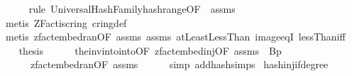 \begin{isabellebody}
\ \ \ \ \isamarkupfalse%
\ {\isacharparenleft}{\kern0pt}rule\ UniversalHashFamily{\isachardot}{\kern0pt}hash{\isacharunderscore}{\kern0pt}range{\isacharbrackleft}{\kern0pt}OF\ {\isacharunderscore}{\kern0pt}\ assms{\isacharparenleft}{\kern0pt}{}{\isacharparenright}{\kern0pt}{\isacharbrackright}{\kern0pt}{\isacharparenright}{\kern0pt}\isanewline
\ \ \ \ \ \isamarkupfalse%
\ {\isacharparenleft}{\kern0pt}metis\ ZFact{\isacharunderscore}{\kern0pt}is{\isacharunderscore}{\kern0pt}cring\ cring{\isacharunderscore}{\kern0pt}def{\isacharparenright}{\kern0pt}\isanewline
\ \ \ \ \isamarkupfalse%
\ {\isacharparenleft}{\kern0pt}metis\ zfact{\isacharunderscore}{\kern0pt}embed{\isacharunderscore}{\kern0pt}ran{\isacharbrackleft}{\kern0pt}OF\ assms{\isacharparenleft}{\kern0pt}{}{\isacharparenright}{\kern0pt}{\isacharbrackright}{\kern0pt}\ assms{\isacharparenleft}{\kern0pt}{}{\isacharparenright}{\kern0pt}\ atLeast{}LessThan\ image{\isacharunderscore}{\kern0pt}eqI\ lessThan{\isacharunderscore}{\kern0pt}iff{\isacharparenright}{\kern0pt}\isanewline
\ \ \isamarkupfalse%
\ {\isacharquery}{\kern0pt}thesis\isanewline
\ \ \ \ \isamarkupfalse%
\ the{\isacharunderscore}{\kern0pt}inv{\isacharunderscore}{\kern0pt}into{\isacharunderscore}{\kern0pt}into{\isacharbrackleft}{\kern0pt}OF\ zfact{\isacharunderscore}{\kern0pt}embed{\isacharunderscore}{\kern0pt}inj{\isacharbrackleft}{\kern0pt}OF\ assms{\isacharparenleft}{\kern0pt}{}{\isacharparenright}{\kern0pt}{\isacharbrackright}{\kern0pt}{\isacharcomma}{\kern0pt}\ \ B{\isacharequal}{\kern0pt}{\isachardoublequoteopen}{\isacharbraceleft}{\kern0pt}{}{\isachardot}{\kern0pt}{\isachardot}{\kern0pt}{\isacharless}{\kern0pt}p{\isacharbraceright}{\kern0pt}{\isachardoublequoteclose}{\isacharbrackright}{\kern0pt}\isanewline
\ \ \ \ \ \ zfact{\isacharunderscore}{\kern0pt}embed{\isacharunderscore}{\kern0pt}ran{\isacharbrackleft}{\kern0pt}OF\ assms{\isacharparenleft}{\kern0pt}{}{\isacharparenright}{\kern0pt}{\isacharbrackright}{\kern0pt}\isanewline
\ \ \ \ \isamarkupfalse%
\ {\isacharparenleft}{\kern0pt}simp\ add{\isacharcolon}{\kern0pt}hash{\isachardot}{\kern0pt}simps{\isacharparenright}{\kern0pt}\isanewline
{}\isamarkupfalse%
%
\endisatagproof
{\isafoldproof}%
%
\isadelimproof
\isanewline
%
\endisadelimproof
\isanewline
{}\isamarkupfalse%
\ hash{\isacharunderscore}{\kern0pt}inj{\isacharunderscore}{\kern0pt}if{\isacharunderscore}{\kern0pt}degree{\isacharunderscore}{\kern0pt}{}{\isacharcolon}{\kern0pt}\isanewline

\end{isabellebody}
